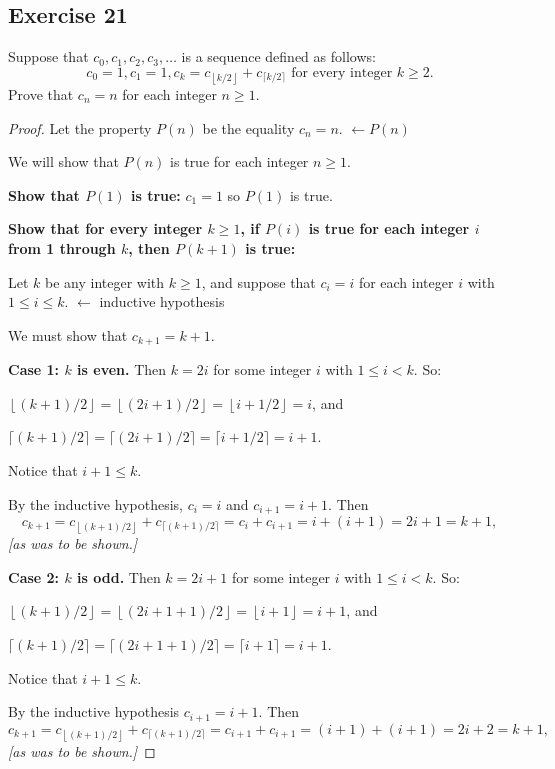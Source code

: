 \documentclass[14pt]{extarticle}
\newcommand{\dps}{\displaystyle}
\newcommand{\from}{\leftarrow}
\newcommand{\floor}[1]{{\left\lfloor#1\right\rfloor}}
\newcommand{\ceil}[1]{{\lceil#1\rceil}}
\newcommand{\cy}{\color{cyan}}
\begin{document}
\subsection{Exercise 21}
Suppose that $c_0, c_1, c_2, c_3, \ldots$ is a sequence defined as follows:
\[
    c_0 = 1, c_1 = 1, c_k = c_{\floor{k/2}} + c_{\ceil{k/2}}  \text{ for every integer } k \geq 2.
\]
Prove that $c_n = n$ for each integer $n \geq 1$.

\begin{proof}
    Let the property $P(n)$ be the equality $c_n = n$. {\cy $\from P(n)$}

    We will show that $P(n)$ is true for each integer $n \geq 1$.

        {\bf Show that $P(1)$ is true:}
    $c_1 = 1$ so $P(1)$ is true.

        {\bf Show that for every integer $k \geq 1$, if $P(i)$ is
            true for each integer $i$ from 1 through $k$, then $P(k + 1)$ is true:}

    Let $k$ be any integer with $k \geq 1$, and suppose that
    $c_i = i$ for each integer $i$ with $1 \leq i \leq k$.
        {\cy $\from$ inductive hypothesis}

    We must show that $c_{k+1} = k+1$.

        {\bf Case 1: $k$ is even.}
    Then $k = 2i$ for some integer $i$ with $1 \leq i < k$. So:

    $\dps \floor{(k+1)/2} = \floor{(2i+1)/2} = \floor{i+1/2} = i$, and

    $\dps \ceil{(k+1)/2} = \ceil{(2i+1)/2} = \ceil{i+1/2} = i+1$.

    Notice that $i + 1 \leq k$.

    By the inductive hypothesis, $c_i = i$ and $c_{i+1} = i+1$. Then
    \[
        c_{k+1} = c_{\floor{(k+1)/2}} + c_{\ceil{(k+1)/2}} = c_i + c_{i+1} = i + (i+1) = 2i+1 = k+1,
    \]
    {\it [as was to be shown.]}

    {\bf Case 2: $k$ is odd.}
    Then $k = 2i + 1$ for some integer $i$ with $1 \leq i < k$. So:

    $\dps \floor{(k + 1)/2} = \floor{(2i + 1 + 1)/2} = \floor{i + 1} = i + 1$, and

    $\dps \ceil{(k + 1)/2} = \ceil{(2i + 1 + 1)/2} = \ceil{i + 1} = i+1$.

    Notice that $i + 1 \leq k$.

    By the inductive hypothesis $c_{i+1} = i+1$. Then
    \[
        c_{k + 1} = c_{\floor{(k+1)/2}} + c_{\ceil{(k+1)/2}} = c_{i + 1} + c_{i + 1} = (i+1) + (i+1) = 2i+2 = k+1,
    \]
    {\it [as was to be shown.]}
\end{proof}
\end{document}
